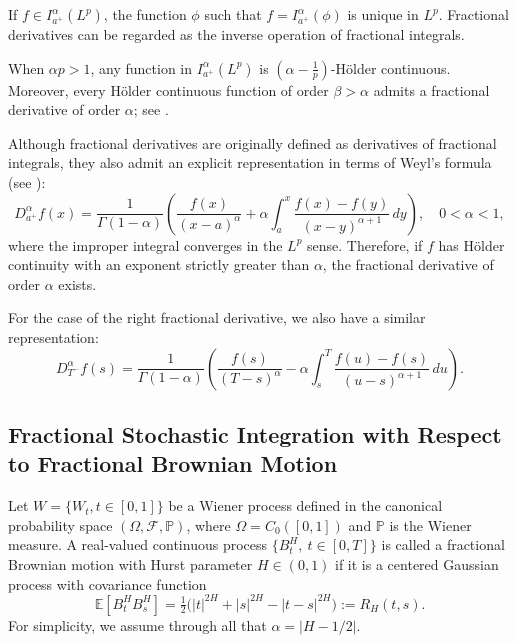 \documentclass{article}
\theoremstyle{definition}  %
\theoremstyle{plain}  %
\begin{document}
	If $f\in I_{a^+}^\alpha(L^p) $, the function $ \phi $ such that $f=I_{a^+}^\alpha(\phi)$ is unique in $L^p $. Fractional derivatives can be regarded as the inverse operation of fractional integrals.
 
 When $\alpha p > 1$, any function in $I_{a^+}^\alpha(L^p)$ is 
$(\alpha - \tfrac{1}{p})$-H\"older continuous. Moreover, every H\"older continuous 
function of order $\beta > \alpha$ admits a fractional derivative of order 
$\alpha$; see \cite[Proposition~2.1]{Decreusefond1999}.

Although fractional derivatives are originally defined as derivatives of 
fractional integrals, they also admit an explicit representation in terms of 
Weyl’s formula (see \cite[Remark~5.3]{Samko1993}):
\begin{equation}
D^\alpha_{a^+} f(x) 
= \frac{1}{\Gamma(1-\alpha)} \left( \frac{f(x)}{(x-a)^\alpha} 
+ \alpha \int_a^x \frac{f(x) - f(y)}{(x-y)^{\alpha+1}}\,dy \right), 
\quad 0<\alpha<1,
\label{Weyl}
\end{equation}
where the improper integral converges in the $L^p$ sense. Therefore, if \( f \) has H\"older continuity with an exponent strictly greater than \( \alpha \),  the fractional derivative of order \( \alpha \) exists.

  	For the case of the right fractional derivative, we also have a similar representation:
\begin{equation}
D_{T^-}^\alpha f(s) 
= \frac{1}{\Gamma(1-\alpha)} \left(
    \frac{f(s)}{(T-s)^\alpha}
    - \alpha \int_s^T \frac{f(u)-f(s)}{(u-s)^{\alpha+1}}\,du
  \right).
\end{equation}







\subsection{Fractional Stochastic Integration with Respect to Fractional Brownian Motion}
      Let $W=\{W_t,t\in [0,1] \}$ be a Wiener process defined in the canonical probability space $(\Omega,\mathcal{F},\mathbb{P})$, where 
 $\Omega=C_0([0,1])$
   and $\mathbb{P}$ is the Wiener measure.
	A real-valued continuous process $\{B^H_t,\ t\in [0,T]\}$ is called a fractional Brownian motion with Hurst parameter $H\in (0,1)$ if it is a centered Gaussian process with covariance function  
\[
  \mathbb{E}[B^H_tB^H_s]
  = \tfrac{1}{2}\big(|t|^{2H}+|s|^{2H}-|t-s|^{2H}\big)
  := R_H(t,s).
\]
For simplicity, we assume through all that $\alpha = |H - 1/2|$.
\end{document}
